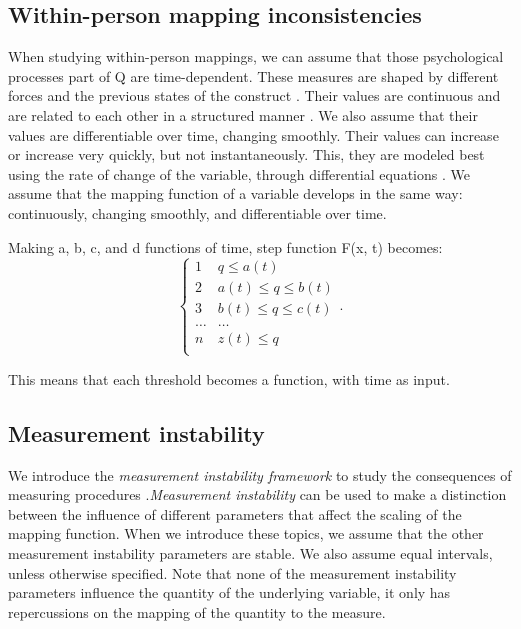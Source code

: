 \documentclass[utf8]{FrontiersinVancouver}
\begin{document}
\subsection{Within-person mapping inconsistencies}
When studying within-person mappings, we can assume that those psychological processes part of Q are time-dependent. These measures are shaped by different forces and the previous states of the construct \citep{olthofComplexityPsychologicalSelfratings2020b}. Their values are continuous and are related to each other in a structured manner \citep{bokerConsequencesContinuityHunt2002}. We also assume that their values are differentiable over time, changing smoothly. Their values can increase or increase very quickly, but not instantaneously. This, they are modeled best using the rate of change of the variable, through differential equations \citep{molenaarNewPersonSpecificParadigm2009}. We assume that the mapping function of a variable develops in the same way: continuously, changing smoothly, and differentiable over time.

Making a, b, c, and d functions of time, step function F(x, t) becomes: 
\[
\begin{cases} 
    1 & q \leq a(t)\\
    2 & a(t) \leq q \leq b(t)\\
    3 & b(t) \leq q \leq c(t)\\
    \ldots & \ldots\\    
    n & z(t) \leq q\\
\end{cases}.
\]

This means that each threshold becomes a function, with time as input. 

\subsection{Measurement instability}
We introduce the \textit{measurement instability framework} to study the consequences of measuring procedures .\textit{Measurement instability} can be used to make a distinction between the influence of different parameters that affect the scaling of the mapping function. When we introduce these topics, we assume that the other measurement instability parameters are stable. We also assume equal intervals, unless otherwise specified. Note that none of the measurement instability parameters influence the quantity of the underlying variable, it only has repercussions on the mapping of the quantity to the measure.
\end{document}
